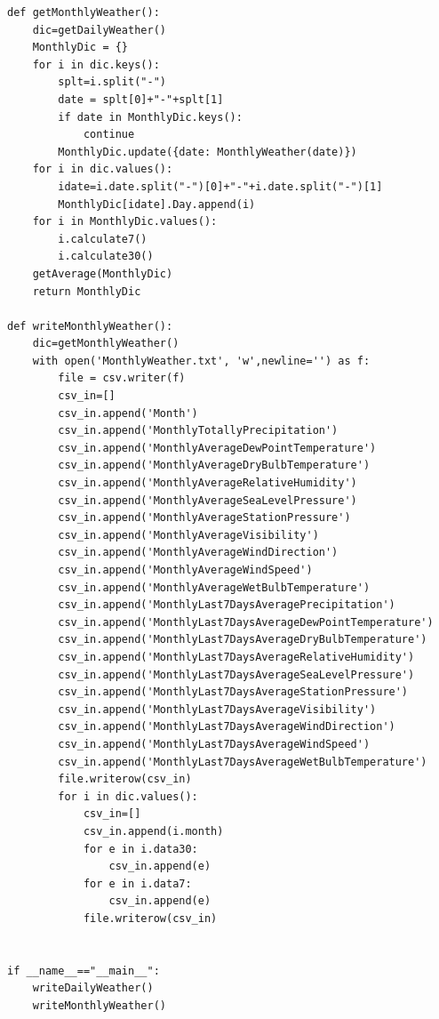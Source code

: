 \documentclass{ctexart}
\begin{document}
\begin{scriptsize}
\begin{verbatim}
def getMonthlyWeather():
    dic=getDailyWeather()
    MonthlyDic = {}
    for i in dic.keys():
        splt=i.split("-")
        date = splt[0]+"-"+splt[1]
        if date in MonthlyDic.keys():
            continue
        MonthlyDic.update({date: MonthlyWeather(date)})
    for i in dic.values():
        idate=i.date.split("-")[0]+"-"+i.date.split("-")[1]
        MonthlyDic[idate].Day.append(i)
    for i in MonthlyDic.values():
        i.calculate7()
        i.calculate30()
    getAverage(MonthlyDic)
    return MonthlyDic

def writeMonthlyWeather():
    dic=getMonthlyWeather()
    with open('MonthlyWeather.txt', 'w',newline='') as f:
        file = csv.writer(f)
        csv_in=[]
        csv_in.append('Month')
        csv_in.append('MonthlyTotallyPrecipitation')
        csv_in.append('MonthlyAverageDewPointTemperature')
        csv_in.append('MonthlyAverageDryBulbTemperature')
        csv_in.append('MonthlyAverageRelativeHumidity')
        csv_in.append('MonthlyAverageSeaLevelPressure')
        csv_in.append('MonthlyAverageStationPressure')
        csv_in.append('MonthlyAverageVisibility')
        csv_in.append('MonthlyAverageWindDirection')
        csv_in.append('MonthlyAverageWindSpeed')
        csv_in.append('MonthlyAverageWetBulbTemperature')
        csv_in.append('MonthlyLast7DaysAveragePrecipitation')
        csv_in.append('MonthlyLast7DaysAverageDewPointTemperature')
        csv_in.append('MonthlyLast7DaysAverageDryBulbTemperature')
        csv_in.append('MonthlyLast7DaysAverageRelativeHumidity')
        csv_in.append('MonthlyLast7DaysAverageSeaLevelPressure')
        csv_in.append('MonthlyLast7DaysAverageStationPressure')
        csv_in.append('MonthlyLast7DaysAverageVisibility')
        csv_in.append('MonthlyLast7DaysAverageWindDirection')
        csv_in.append('MonthlyLast7DaysAverageWindSpeed')
        csv_in.append('MonthlyLast7DaysAverageWetBulbTemperature')
        file.writerow(csv_in)
        for i in dic.values():
            csv_in=[]
            csv_in.append(i.month)
            for e in i.data30:
                csv_in.append(e)
            for e in i.data7:
                csv_in.append(e)
            file.writerow(csv_in)


if __name__=="__main__":
    writeDailyWeather()
    writeMonthlyWeather()

\end{verbatim}
\end{scriptsize}
\end{document}
